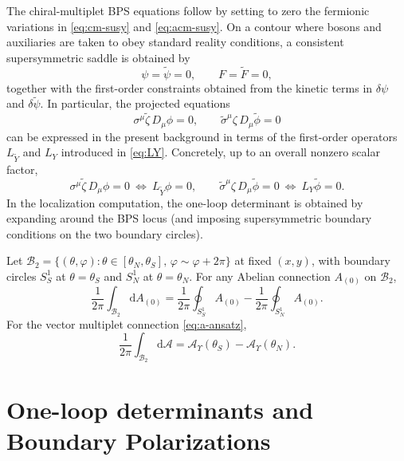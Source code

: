 \documentclass[11pt,a4paper]{article}
\numberwithin{equation}{section}
\theoremstyle{plain}
\theoremstyle{definition}
\theoremstyle{remark}
\newcommand{\dd}{\mathrm{d}}
\begin{document}
The chiral-multiplet BPS equations follow by setting to zero the fermionic variations in \eqref{eq:cm-susy} and \eqref{eq:acm-susy}.
On a contour where bosons and auxiliaries are taken to obey standard reality conditions, a consistent supersymmetric saddle is obtained by
\begin{equation}
\psi=\widetilde\psi=0,\qquad F=\widetilde F=0,
\label{eq:chiral-BPS-aux}
\end{equation}
together with the first-order constraints obtained from the kinetic terms in $\delta\psi$ and $\delta\widetilde\psi$.
In particular, the projected equations
\begin{equation}
\sigma^\mu\widetilde\zeta\,D_\mu\phi=0,
\qquad
\widetilde\sigma^\mu\zeta\,D_\mu\widetilde\phi=0
\label{eq:chiral-BPS-proj}
\end{equation}
can be expressed in the present background in terms of the first-order operators
$L_{\widetilde Y}$ and $L_Y$ introduced in \eqref{eq:LY}. Concretely, up to an overall nonzero scalar factor,
\begin{equation}
\sigma^\mu\widetilde\zeta\,D_\mu\phi=0\ \Longleftrightarrow\ L_{\widetilde Y}\phi=0,
\qquad
\widetilde\sigma^\mu\zeta\,D_\mu\widetilde\phi=0\ \Longleftrightarrow\ L_Y\widetilde\phi=0.
\label{eq:chiral-BPS-LY}
\end{equation}
In the localization computation, the one-loop determinant is obtained by expanding around the BPS locus
(and imposing supersymmetric boundary conditions on the two boundary circles).


Let $\mathcal{B}_2=\{(\theta,\varphi):\theta\in[\theta_N,\theta_S],\,\varphi\sim\varphi+2\pi\}$ at fixed $(x,y)$, with boundary circles
$S^1_S$ at $\theta=\theta_S$ and $S^1_N$ at $\theta=\theta_N$.
For any Abelian connection $A_{(0)}$ on $\mathcal{B}_2$,
\begin{equation}
\frac{1}{2\pi}\int_{\mathcal{B}_2} \dd A_{(0)}
=
\frac{1}{2\pi}\oint_{S^1_S} A_{(0)}
-
\frac{1}{2\pi}\oint_{S^1_N} A_{(0)}.
\label{eq:flux}
\end{equation}
For the vector multiplet connection \eqref{eq:a-ansatz},
\begin{equation}
\frac{1}{2\pi}\int_{\mathcal{B}_2} \dd\mathcal A
=
\mathcal A_\Upsilon(\theta_S)-\mathcal A_\Upsilon(\theta_N).
\label{eq:fluxgauge}
\end{equation}

\section{One-loop determinants and Boundary Polarizations}\label{sec:oneloop}
\end{document}
